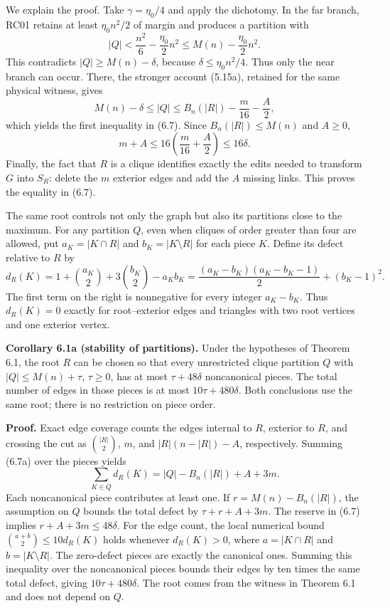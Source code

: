 \documentclass[english,11pt,a4paper]{article}
\begin{document}
We explain the proof. Take \(\gamma=\eta_0/4\) and apply the dichotomy. In the far branch, RC01 retains at least \(\eta_0n^2/2\) of margin and produces a partition with \[
|Q|<\frac{n^2}{6}-\frac{\eta_0}{2}n^2
\le M(n)-\frac{\eta_0}{2}n^2.
\] This contradicts \(|Q|\ge M(n)-\delta\), because \(\delta\le\eta_0n^2/4\). Thus only the near branch can occur. There, the stronger account (5.15a), retained for the same physical witness, gives \[
M(n)-\delta\le |Q|
\le B_n(|R|)-\frac m{16}-\frac A2,
\] which yields the first inequality in (6.7). Since \(B_n(|R|)\le M(n)\) and \(A\ge0\), \[
m+A\le16\left(\frac m{16}+\frac A2\right)\le16\delta.
\] Finally, the fact that \(R\) is a clique identifies exactly the edits needed to transform \(G\) into \(S_R\): delete the \(m\) exterior edges and add the \(A\) missing links. This proves the equality in (6.7).

The same root controls not only the graph but also its partitions close to the maximum. For any partition \(Q\), even when cliques of order greater than four are allowed, put \(a_K=|K\cap R|\) and \(b_K=|K\setminus R|\) for each piece \(K\). Define its defect relative to \(R\) by \[
d_R(K)=1+\binom{a_K}{2}+3\binom{b_K}{2}-a_Kb_K
=\frac{(a_K-b_K)(a_K-b_K-1)}2+(b_K-1)^2.
\tag{6.7a}
\] The first term on the right is nonnegative for every integer \(a_K-b_K\). Thus \(d_R(K)=0\) exactly for root--exterior edges and triangles with two root vertices and one exterior vertex.


\textbf{Corollary 6.1a (stability of partitions).} Under the hypotheses of Theorem 6.1, the root \(R\) can be chosen so that every unrestricted clique partition \(Q\) with \(|Q|\le M(n)+\tau\), \(\tau\ge0\), has at most \(\tau+48\delta\) noncanonical pieces. The total number of edges in those pieces is at most \(10\tau+480\delta\). Both conclusions use the same root; there is no restriction on piece order.

\textbf{Proof.} Exact edge coverage counts the edges internal to \(R\), exterior to \(R\), and crossing the cut as \(\binom{|R|}{2}\), \(m\), and \(|R|(n-|R|)-A\), respectively. Summing (6.7a) over the pieces yields \[
\sum_{K\in Q}d_R(K)=|Q|-B_n(|R|)+A+3m.
\tag{6.7b}
\] Each noncanonical piece contributes at least one. If \(r=M(n)-B_n(|R|)\), the assumption on \(Q\) bounds the total defect by \(\tau+r+A+3m\). The reserve in (6.7) implies \(r+A+3m\le48\delta\). For the edge count, the local numerical bound \(\binom{a+b}{2}\le10d_R(K)\) holds whenever \(d_R(K)>0\), where \(a=|K\cap R|\) and \(b=|K\setminus R|\). The zero-defect pieces are exactly the canonical ones. Summing this inequality over the noncanonical pieces bounds their edges by ten times the same total defect, giving \(10\tau+480\delta\). The root comes from the witness in Theorem 6.1 and does not depend on \(Q\).
\end{document}

